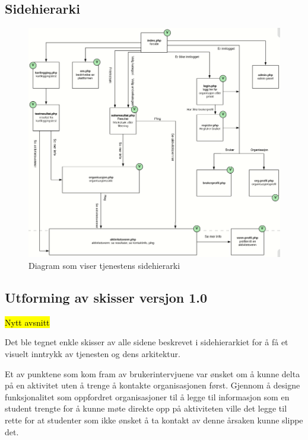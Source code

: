 \subsection{Sidehierarki}
\begin{figure}[H]
\includegraphics[width=\textwidth]{Illustrasjoner/trehierarki.png}
\caption{Diagram som viser tjenestens sidehierarki}
\label{fig:trehierarki}
\end{figure}



\subsection{Utforming av skisser versjon 1.0}
\label{section:utforming-1}
\hl{Nytt avsnitt}

Det ble tegnet enkle skisser av alle sidene beskrevet i sidehierarkiet for å få et visuelt inntrykk av tjenesten og dens arkitektur.

Et av punktene som kom fram av brukerintervjuene var ønsket om å kunne delta på en aktivitet uten å trenge å kontakte organisasjonen først. Gjennom å designe funksjonalitet som oppfordret organisasjoner til å legge til informasjon som en student trengte for å kunne møte direkte opp på aktiviteten ville det legge til rette for at studenter som ikke ønsket å ta kontakt av denne årsaken kunne slippe det.


